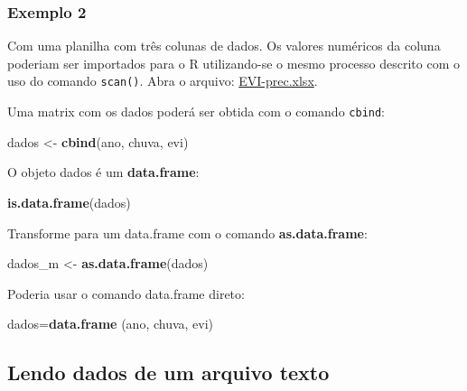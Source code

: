 \documentclass[
]{book}
\newenvironment{Shaded}{\begin{snugshade}}{\end{snugshade}}
\newcommand{\KeywordTok}[1]{\textcolor[rgb]{0.13,0.29,0.53}{\textbf{#1}}}
\newcommand{\NormalTok}[1]{#1}
\newcommand{\StringTok}[1]{\textcolor[rgb]{0.31,0.60,0.02}{#1}}
\begin{document}
\hypertarget{exemplo-2}{%
\subsubsection{Exemplo 2}\label{exemplo-2}}

Com uma planilha com três colunas de dados. Os valores numéricos da coluna poderiam ser importados para o R utilizando-se o mesmo processo descrito com o uso do comando \texttt{scan()}. Abra o arquivo: \href{https://www.dropbox.com/s/6504oo4olw34dw9/EVI_Prec.xlsx?dl=1}{EVI-prec.xlsx}.

Uma matrix com os dados poderá ser obtida com o comando \texttt{cbind}:

\begin{Shaded}
\begin{Highlighting}[]
\NormalTok{dados <-}\StringTok{ }\KeywordTok{cbind}\NormalTok{(ano, chuva, evi)}
\end{Highlighting}
\end{Shaded}

O objeto dados é um \textbf{data.frame}:

\begin{Shaded}
\begin{Highlighting}[]
\KeywordTok{is.data.frame}\NormalTok{(dados)}
\end{Highlighting}
\end{Shaded}

Transforme para um data.frame com o comando \textbf{as.data.frame}:

\begin{Shaded}
\begin{Highlighting}[]
\NormalTok{dados_m <-}\StringTok{ }\KeywordTok{as.data.frame}\NormalTok{(dados)}
\end{Highlighting}
\end{Shaded}

Poderia usar o comando data.frame direto:

\begin{Shaded}
\begin{Highlighting}[]
\NormalTok{dados=}\KeywordTok{data.frame}\NormalTok{ (ano, chuva, evi)}
\end{Highlighting}
\end{Shaded}

\hypertarget{lendo-dados-de-um-arquivo-texto}{%
\subsection{Lendo dados de um arquivo texto}\label{lendo-dados-de-um-arquivo-texto}}
\end{document}
